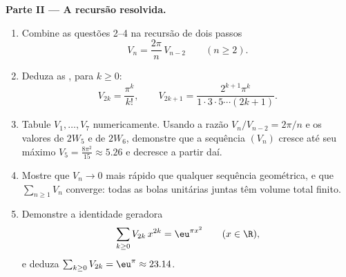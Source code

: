 \begin{problem}[{Problema de fim de semana --- $V_n =
\pi^{n/2}/\Gamma(\frac n2 + 1)$, e a estranheza das
dimensões altas}]
\medskip
\noindent\textbf{Parte II --- A recursão resolvida.}
\begin{enumerate}[resume]
  \item Combine as questões 2--4 na recursão de dois passos
        \[
        V_n = \frac{2\pi}{n}\,V_{n-2}
        \qquad (n \geq 2).
        \]
  \item Deduza as , para $k \geq 0$:
        \[
        V_{2k} = \frac{\pi^k}{k!},
        \qquad
        V_{2k+1} = \frac{2^{k+1}\pi^k}{1\cdot3\cdot5\cdots
        (2k+1)} .
        \]
  \item Tabule $V_1, \dots, V_7$ numericamente. Usando a
        razão $V_n/V_{n-2} = 2\pi/n$ e os valores de $2W_5$
        e de $2W_6$, demonstre que a sequência $(V_n)$ cresce
        até seu máximo $V_5 = \frac{8\pi^2}{15} \approx
        5.26$ e decresce a partir daí.
  \item Mostre que $V_n \to 0$ mais rápido que qualquer sequência
        geométrica, e que $\sum_{n\geq1} V_n$ converge: todas
        as bolas unitárias juntas têm volume total finito.
  \item Demonstre a identidade geradora
        \[
        \sum_{k\geq0} V_{2k}\,x^{2k} = \eu^{\pi x^2}
        \qquad (x \in \R),
        \]
        e deduza $\sum_{k\geq0}V_{2k} = \eu^\pi \approx
        23.14$.
\end{enumerate}


\end{problem}
